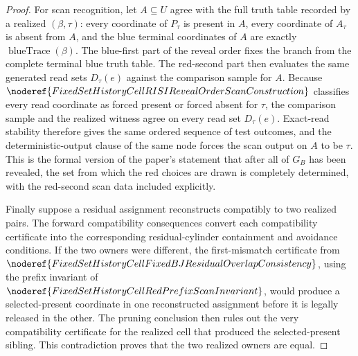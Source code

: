 \begin{proof}
For scan recognition, let \(A\subseteq U\) agree with the full truth table
recorded by a realized \((\beta,\tau)\): every coordinate of \(P_\tau\) is
present in \(A\), every coordinate of \(A_\tau\) is absent from \(A\), and
the blue terminal coordinates of \(A\) are exactly
\(\operatorname{blueTrace}(\beta)\).  The blue-first part of the reveal order
fixes the branch from the complete terminal blue truth table.  The
red-second part then evaluates the same generated read sets \(D_\tau(e)\)
against the comparison sample for \(A\).  Because
\(\noderef{FixedSetHistoryCellRISIRevealOrderScanConstruction}\) classifies
every read coordinate as forced present or forced absent for \(\tau\), the
comparison sample and the realized witness agree on every read set
\(D_\tau(e)\).  Exact-read stability therefore gives the same ordered
sequence of test outcomes, and the deterministic-output clause of the same
node forces the scan output on \(A\) to be \(\tau\).  This is the formal
version of the paper's statement that after all of \(G_B\) has been revealed,
the set from which the red choices are drawn is completely determined, with
the red-second scan data included explicitly.

Finally suppose a residual assignment reconstructs compatibly to two
realized pairs.  The forward compatibility consequences convert each
compatibility certificate into the corresponding residual-cylinder
containment and avoidance conditions.  If the two owners were different,
the first-mismatch certificate from
\(\noderef{FixedSetHistoryCellFixedBJResidualOverlapConsistency}\), using
the prefix invariant of
\(\noderef{FixedSetHistoryCellRedPrefixScanInvariant}\), would produce a
selected-present coordinate in one reconstructed assignment before it is
legally released in the other.  The pruning conclusion then rules out the
very compatibility certificate for the realized cell that produced the
selected-present sibling.  This contradiction proves that the two realized
owners are equal.
\end{proof}
